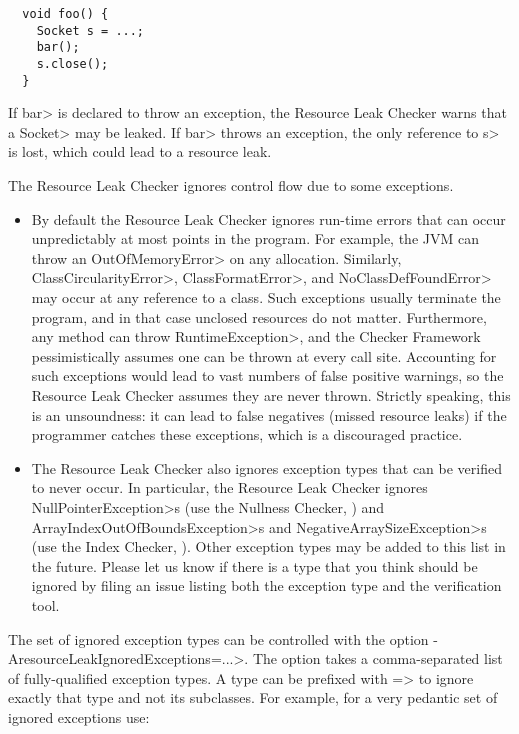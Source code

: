 \begin{verbatim}
  void foo() {
    Socket s = ...;
    bar();
    s.close();
  }
\end{verbatim}

If \<bar> is declared to throw an exception, the Resource Leak Checker
warns that a \<Socket> may be leaked.  If \<bar> throws an exception, the
only reference to \<s> is lost, which could lead to a resource leak.

The Resource Leak Checker ignores control flow due to some exceptions.

\begin{itemize}
\item
By default the Resource Leak Checker ignores run-time errors that can occur
unpredictably at most points in the program. For example, the JVM can throw
an \<OutOfMemoryError> on any allocation.  Similarly,
\<ClassCircularityError>, \<ClassFormatError>, and \<NoClassDefFoundError>
may occur at any reference to a class.  Such exceptions usually terminate
the program, and in that case unclosed resources do not matter.
Furthermore, any method can throw \<RuntimeException>, and the Checker
Framework pessimistically assumes one can be thrown at every call site.
Accounting for such exceptions would lead to vast numbers of
false positive warnings, so the Resource Leak Checker assumes they are
never thrown.  Strictly speaking, this is an unsoundness:  it can lead to
false negatives (missed resource leaks) if the programmer catches these
exceptions, which is a discouraged practice.

\item
The Resource Leak Checker also ignores exception types that can be verified
to never occur.  In particular, the Resource Leak Checker ignores \<NullPointerException>s
(use the Nullness Checker, ) and
\<ArrayIndexOutOfBoundsException>s and \<NegativeArraySizeException>s (use the Index
Checker, ). Other exception types may be added to this
list in the future.  Please let us know if there is a type that you think should
be ignored by filing an issue listing both the exception type and the
verification tool.
\end{itemize}

The set of ignored exception types can be controlled with the option
\<-AresourceLeakIgnoredExceptions=...>.  The option takes a comma-separated list of
fully-qualified exception types.  A type can be prefixed with \<=> to ignore exactly
that type and not its subclasses.  For example, for a very pedantic set of ignored
exceptions use:

